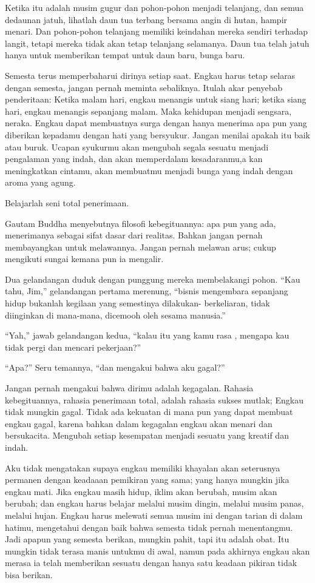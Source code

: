 Ketika itu adalah musim gugur dan pohon-pohon menjadi telanjang, dan semua dedaunan jatuh, lihatlah daun tua terbang bersama angin di hutan, hampir menari. Dan pohon-pohon telanjang memiliki keindahan mereka sendiri terhadap langit, tetapi mereka tidak akan tetap telanjang selamanya. Daun tua telah jatuh hanya untuk memberikan tempat untuk daun baru, bunga baru.

Semesta terus memperbaharui dirinya setiap saat. Engkau harus tetap selaras dengan semesta, jangan pernah meminta sebaliknya. Itulah akar penyebab penderitaan: Ketika malam hari, engkau menangis untuk siang hari; ketika siang hari, engkau menangis sepanjang malam. Maka kehidupan menjadi sengsara, neraka. Engkau dapat membuatnya surga dengan hanya menerima apa pun yang diberikan kepadamu dengan hati yang bersyukur. Jangan menilai apakah itu baik atau buruk. Ucapan syukurmu akan mengubah segala sesuatu menjadi pengalaman yang indah, dan akan memperdalam kesadaranmu,a kan meningkatkan cintamu, akan membuatmu menjadi bunga yang indah dengan aroma yang agung.

Belajarlah seni total penerimaan.

Gautam Buddha menyebutnya filosofi kebegituannya: apa pun yang ada, menerimanya sebagai sifat dasar dari realitas. Bahkan jangan pernah membayangkan untuk melawannya. Jangan pernah melawan arus; cukup mengikuti sungai kemana pun ia mengalir.

Dua gelandangan duduk dengan punggung mereka membelakangi pohon. “Kau tahu, Jim,” gelandangan pertama merenung, “bisnis mengembara sepanjang hidup bukanlah kegilaan yang semestinya dilakukan- berkeliaran, tidak diinginkan di mana-mana, dicemooh oleh sesama manusia.”

“Yah,” jawab gelandangan kedua, “kalau itu yang kamu rasa , mengapa kau tidak pergi dan mencari pekerjaan?”

“Apa?” Seru temannya, “dan mengakui bahwa aku gagal?”

Jangan pernah mengakui bahwa dirimu adalah kegagalan. Rahasia kebegituannya, rahasia penerimaan total,  adalah rahasia sukses mutlak; Engkau tidak mungkin gagal. Tidak ada kekuatan di mana pun yang dapat membuat engkau gagal, karena bahkan dalam kegagalan engkau akan menari dan bersukacita. Mengubah setiap kesempatan menjadi sesuatu yang kreatif dan indah.

Aku tidak mengatakan supaya engkau memiliki khayalan akan seterusnya permanen dengan keadaaan pemikiran yang sama; yang hanya mungkin jika engkau mati. Jika engkau masih hidup, iklim akan berubah, musim akan berubah; dan engkau harus belajar melalui musim dingin, melalui musim panas, melalui hujan. Engkau harus melewati semua musim ini dengan tarian di dalam hatimu, mengetahui dengan baik bahwa semesta tidak pernah menentangmu. Jadi apapun yang semesta berikan, mungkin pahit, tapi itu adalah obat. Itu mungkin tidak terasa manis untukmu di awal, namun pada akhirnya engkau akan merasa ia telah memberikan sesuatu dengan hanya satu keadaan pikiran tidak bisa berikan.

